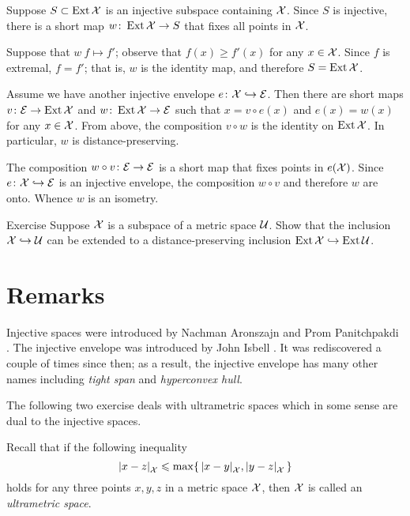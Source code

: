 Suppose $S\subset \mathop{\rm Ext}\nolimits\mathcal{X}$ is an injective subspace containing $\mathcal{X}$.
Since $S$ is injective, there is a short map $w\colon\mathop{\rm Ext}\nolimits\mathcal{X}\to S$ that fixes all points in $\mathcal{X}$.

Suppose that $w\:f\mapsto f'$; observe that $f(x)\ge f'(x)$ for any $x\in \mathcal{X}$.
Since $f$ is extremal, $f=f'$;
that is, $w$ is the identity map, and therefore $S=\mathop{\rm Ext}\nolimits\mathcal{X}$.

Assume we have another injective envelope $e\colon\mathcal{X}\hookrightarrow \mathcal{E}$.
Then there are short maps $v\colon\mathcal{E}\to \mathop{\rm Ext}\nolimits\mathcal{X}$ and $w\colon\mathop{\rm Ext}\nolimits\mathcal{X}\to \mathcal{E}$ such that $x=v\circ e(x)$ and $e(x)=w(x)$ for any $x\in\mathcal{X}$.
From above, the composition $v\circ w$ is the identity on $\mathop{\rm Ext}\nolimits\mathcal{X}$.
In particular, $w$ is distance-preserving.

The composition $w\circ v\colon\mathcal{E}\to \mathcal{E}$ is a short map that fixes points in $e(\mathcal{X})$.
Since $e\colon\mathcal{X}\hookrightarrow \mathcal{E}$ is an injective envelope, the composition $w\circ v$ and therefore $w$ are onto.
Whence $w$ is an isometry.
\qeds

\begin{thm}{Exercise}\label{ex:d-p-inclusion}
Suppose $\mathcal{X}$ is a subspace of a metric space $\mathcal{U}$.
Show that the inclusion $\mathcal{X}\hookrightarrow\mathcal{U}$ can be extended to a distance-preserving inclusion $\mathop{\rm Ext}\nolimits\mathcal{X}\hookrightarrow\mathop{\rm Ext}\nolimits\mathcal{U}$.
\end{thm}


\section{Remarks}

Injective spaces were introduced by Nachman Aronszajn and Prom Panitchpakdi \cite{aronszajn-panitchpakdi}.
The injective envelope was introduced by John Isbell \cite{isbell}.
It was rediscovered a couple of times since then;
as a result, the injective envelope has many other names including \emph{tight span} and \emph{hyperconvex hull}.

The following two exercise deals with ultrametric spaces which in some sense are dual to the injective spaces. 

Recall that if the following inequality
\[\dist{x}{z}{\spc{X}}
\le
\max\{\,\dist{x}{y}{\spc{X}},\dist{y}{z}{\spc{X}}\,\}\]
holds for any three points $x,y,z$ in a metric space $\mathcal{X}$,
then $\mathcal{X}$ is called an \emph{ultrametric space}.

